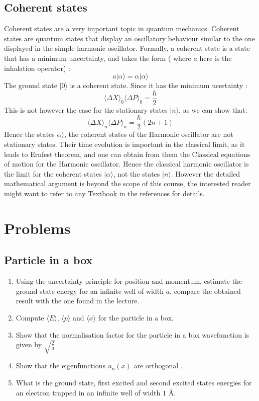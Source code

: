 \subsection{Coherent states}
Coherent states are a very important topic in quantum mechanics. Coherent states are quantum states that display an oscillatory behaviour similar to the one displayed in the simple harmonic oscillator. Formally, a coherent state is a state that has a minimum uncertainty, and takes the form ( where $a$ here is the inhalation operator) :
\begin{equation}
a | \alpha\rangle = \alpha | \alpha\rangle
\end{equation}
The ground state  $ |0 \rangle $ is a coherent state. Since it has the minimum ucertainty :
\begin{equation}
\langle \Delta X \rangle _0\langle \Delta P \rangle _0 = \frac{\hbar}{2}
\end{equation}
This is not however the case for the stationary states $ |n\rangle$, as we can show that:
\begin{equation}
\langle \Delta X \rangle _n\langle \Delta P \rangle _n = \frac{\hbar}{2}(2n+1)
\end{equation}
Hence the states $ \alpha \rangle$, the coherent states of the Harmonic oscillator are not stationary states. Their time evolution is important in the classical limit, as it leads to Ernfest theorem, and one can obtain from them the Classical equations of motion for the Harmonic oscillator. Hence the classical harmonic oscillator is the limit for the coherent states $ | \alpha\rangle $, not the states $ |n\rangle $. However the detailed mathematical argument is beyond the scope of this course, the interested reader might want to refer to any Textbook in the references for details.
\section{Problems}
\subsection{Particle in a box}
\begin{enumerate}
	\item Using the uncertainty principle for position and momentum, estimate the ground state energy for an infinite well of width $a$, compare the obtained result with the one found in the lecture. 
	\item Compute $ \langle E \rangle$, $\langle p \rangle$ and $\langle x \rangle$ for the particle in a box. 
	\item Show that the normalisation factor for the particle in a box wavefunction is given by $ \sqrt{\frac{2}{a}} $ 
	\item Show that the eigenfunctions $ u_n(x)$ are orthogonal .
	\item What is the ground state, first excited and second excited states energies for an electron trapped in an infinite well of width $ 1 $ \AA .
\end{enumerate}
